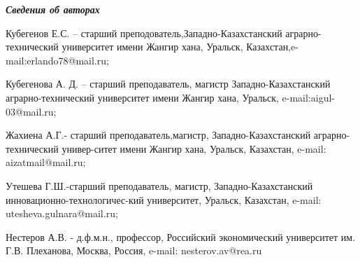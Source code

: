 \emph{{\bfseries Сведения об авторах}}
\begin{noparindent}

Кубегенов Е.С. -- старший преподователь,Западно-Казахстанский
аграрно-технический университет имени Жангир хана, Уральск,
Казахстан,e-mail:erlando78@mail.ru;

Кубегенова А. Д. -- старший преподаватель, магистр Западно-Казахстанский
аграрно-технический университет имени Жангир хана, Уральск,
e-mail:aigul-03@mail.ru;

Жахиена А.Г.- старший преподаватель,магистр, Западно-Казахстанский
аграрно-технический универ-ситет имени Жангир хана, Уральск, Казахстан,
e-mail: aizatmail@mail.ru;

Утешева Г.Ш.-старший преподаватель, магистр, Западно-Казахстанский
инновационно-технологичес-кий университет, Уральск, Казахстан, e-mail:
utesheva.gulnara@mail.ru;

Нестеров А.В. - д.ф.м.н., профессор, Российский экономический
университет им. Г.В. Плеханова, Москва, Россия, e-mail:
nesterov.av@rea.ru

\end{noparindent}
